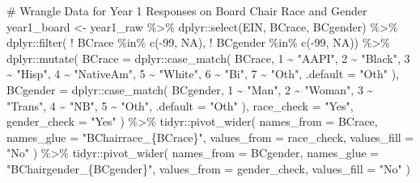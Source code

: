 \documentclass[
  letterpaper,
]{scrbook}
\newenvironment{Shaded}{\begin{snugshade}}{\end{snugshade}}
\newcommand{\AttributeTok}[1]{\textcolor[rgb]{0.40,0.45,0.13}{#1}}
\newcommand{\CommentTok}[1]{\textcolor[rgb]{0.37,0.37,0.37}{#1}}
\newcommand{\ConstantTok}[1]{\textcolor[rgb]{0.56,0.35,0.01}{#1}}
\newcommand{\DecValTok}[1]{\textcolor[rgb]{0.68,0.00,0.00}{#1}}
\newcommand{\FunctionTok}[1]{\textcolor[rgb]{0.28,0.35,0.67}{#1}}
\newcommand{\NormalTok}[1]{\textcolor[rgb]{0.00,0.23,0.31}{#1}}
\newcommand{\OtherTok}[1]{\textcolor[rgb]{0.00,0.23,0.31}{#1}}
\newcommand{\SpecialCharTok}[1]{\textcolor[rgb]{0.37,0.37,0.37}{#1}}
\newcommand{\StringTok}[1]{\textcolor[rgb]{0.13,0.47,0.30}{#1}}
\begin{document}
\begin{Shaded}
\begin{Highlighting}[]
\CommentTok{\# Wrangle Data for Year 1 Responses on Board Chair Race and Gender}
\NormalTok{year1\_board }\OtherTok{\textless{}{-}}\NormalTok{ year1\_raw }\SpecialCharTok{\%\textgreater{}\%} 
\NormalTok{  dplyr}\SpecialCharTok{::}\FunctionTok{select}\NormalTok{(EIN, BCrace, BCgender) }\SpecialCharTok{\%\textgreater{}\%} 
\NormalTok{  dplyr}\SpecialCharTok{::}\FunctionTok{filter}\NormalTok{(  }\SpecialCharTok{!}\NormalTok{ BCrace }\SpecialCharTok{\%in\%} \FunctionTok{c}\NormalTok{(}\SpecialCharTok{{-}}\DecValTok{99}\NormalTok{, }\ConstantTok{NA}\NormalTok{),}
                  \SpecialCharTok{!}\NormalTok{ BCgender }\SpecialCharTok{\%in\%} \FunctionTok{c}\NormalTok{(}\SpecialCharTok{{-}}\DecValTok{99}\NormalTok{, }\ConstantTok{NA}\NormalTok{)) }\SpecialCharTok{\%\textgreater{}\%} 
\NormalTok{  dplyr}\SpecialCharTok{::}\FunctionTok{mutate}\NormalTok{(}
    \AttributeTok{BCrace =}\NormalTok{ dplyr}\SpecialCharTok{::}\FunctionTok{case\_match}\NormalTok{(}
\NormalTok{      BCrace,}
      \DecValTok{1} \SpecialCharTok{\textasciitilde{}} \StringTok{"AAPI"}\NormalTok{, }\DecValTok{2} \SpecialCharTok{\textasciitilde{}} \StringTok{"Black"}\NormalTok{, }\DecValTok{3} \SpecialCharTok{\textasciitilde{}} \StringTok{"Hisp"}\NormalTok{, }\DecValTok{4} \SpecialCharTok{\textasciitilde{}} \StringTok{"NativeAm"}\NormalTok{, }\DecValTok{5} \SpecialCharTok{\textasciitilde{}} \StringTok{"White"}\NormalTok{, }\DecValTok{6} \SpecialCharTok{\textasciitilde{}} \StringTok{"Bi"}\NormalTok{, }\DecValTok{7} \SpecialCharTok{\textasciitilde{}} \StringTok{"Oth"}\NormalTok{,}
      \AttributeTok{.default =} \StringTok{"Oth"}
\NormalTok{    ),}
    \AttributeTok{BCgender =}\NormalTok{ dplyr}\SpecialCharTok{::}\FunctionTok{case\_match}\NormalTok{(}
\NormalTok{      BCgender,}
      \DecValTok{1} \SpecialCharTok{\textasciitilde{}} \StringTok{"Man"}\NormalTok{, }\DecValTok{2} \SpecialCharTok{\textasciitilde{}} \StringTok{"Woman"}\NormalTok{, }\DecValTok{3} \SpecialCharTok{\textasciitilde{}} \StringTok{"Trans"}\NormalTok{, }\DecValTok{4} \SpecialCharTok{\textasciitilde{}} \StringTok{"NB"}\NormalTok{, }\DecValTok{5} \SpecialCharTok{\textasciitilde{}} \StringTok{"Oth"}\NormalTok{,}
      \AttributeTok{.default =} \StringTok{"Oth"}
\NormalTok{    ),}
  \AttributeTok{race\_check =} \StringTok{"Yes"}\NormalTok{,}
  \AttributeTok{gender\_check =} \StringTok{"Yes"}
\NormalTok{  ) }\SpecialCharTok{\%\textgreater{}\%} 
\NormalTok{  tidyr}\SpecialCharTok{::}\FunctionTok{pivot\_wider}\NormalTok{(}
    \AttributeTok{names\_from =}\NormalTok{ BCrace,}
    \AttributeTok{names\_glue =} \StringTok{"BChairrace\_\{BCrace\}"}\NormalTok{,}
    \AttributeTok{values\_from =}\NormalTok{ race\_check, }
    \AttributeTok{values\_fill =} \StringTok{"No"}
\NormalTok{  ) }\SpecialCharTok{\%\textgreater{}\%} 
\NormalTok{  tidyr}\SpecialCharTok{::}\FunctionTok{pivot\_wider}\NormalTok{(}
    \AttributeTok{names\_from =}\NormalTok{ BCgender,}
    \AttributeTok{names\_glue =} \StringTok{"BChairgender\_\{BCgender\}"}\NormalTok{,}
    \AttributeTok{values\_from =}\NormalTok{ gender\_check, }
    \AttributeTok{values\_fill =} \StringTok{"No"}
\NormalTok{  )}


\end{Highlighting}
\end{Shaded}
\end{document}
